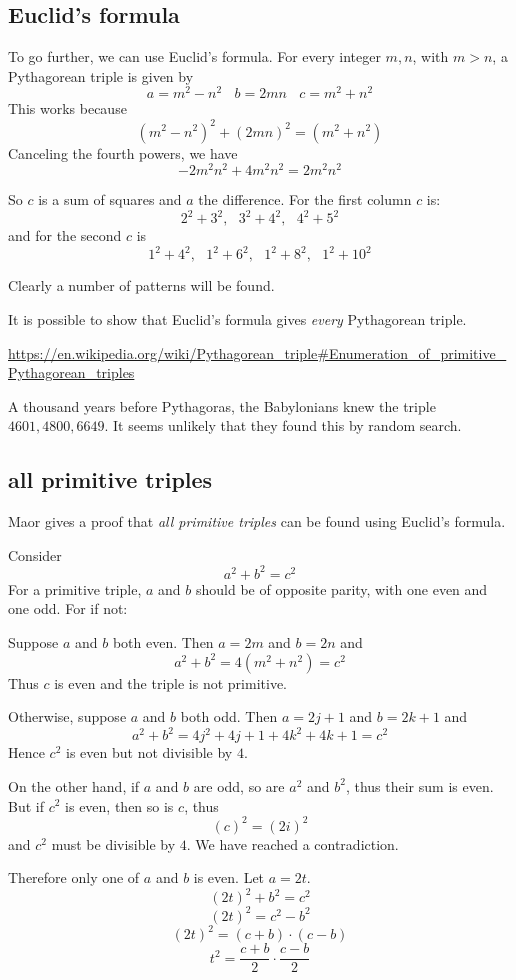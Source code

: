 \documentclass[11pt, oneside]{article}
\begin{document}
\subsection*{Euclid's formula}

To go further, we can use Euclid's formula.  For every integer $m,n$, with $m > n$, a Pythagorean triple is given by
\[ a = m^2 - n^2 \ \ \ \ b = 2mn \ \ \ \ c = m^2 + n^2 \]
This works because
\[ (m^2 - n^2)^2 + (2mn)^2  =  (m^2 + n^2) \]
Canceling the fourth powers, we have
\[ -2m^2n^2 + 4m^2n^2 = 2m^2n^2 \]

So $c$ is a sum of squares and $a$ the difference.  For the first column $c$ is:
\[ 2^2 + 3^2, \ \ \ 3^2 + 4^2, \ \ \ 4^2 + 5^2 \]
and for the second $c$ is
\[ 1^2 + 4^2, \ \ \ 1^2 + 6^2, \ \ \ 1^2 + 8^2, \ \ \ 1^2 + 10^2 \]

Clearly a number of patterns will be found.

It is possible to show that Euclid's formula gives \emph{every} Pythagorean triple.

\url{https://en.wikipedia.org/wiki/Pythagorean_triple#Enumeration_of_primitive_Pythagorean_triples}

A thousand years before Pythagoras, the Babylonians knew the triple $4601,4800,6649$.  It seems unlikely that they found this by random search.

\subsection*{all primitive triples}
Maor gives a proof that \emph{all primitive triples} can be found using Euclid's formula.

Consider 
\[ a^2 + b^2 = c^2 \]
For a primitive triple, $a$ and $b$ should be of opposite parity, with one even and one odd.  For if not:

Suppose $a$ and $b$ both even.  Then $a = 2m$ and $b = 2n$ and
\[ a^2 + b^2 = 4(m^2 + n^2) = c^2 \]
Thus $c$ is even and the triple is not primitive.

Otherwise, suppose $a$ and $b$ both odd.  Then $a = 2j +1$ and $b = 2k + 1$ and
\[ a^2 + b^2 = 4j^2 + 4j + 1 + 4k^2 + 4k + 1 = c^2 \]
Hence $c^2$ is even but not divisible by $4$.

On the other hand, if $a$ and $b$ are odd, so are $a^2$ and $b^2$, thus their sum is even.  But if $c^2$ is even, then so is $c$, thus 
\[ (c)^2 = (2i)^2 \]
and $c^2$ must be divisible by $4$.  We have reached a contradiction.  

Therefore only one of $a$ and $b$ is even.  Let $a = 2t$.
\[ (2t)^2 + b^2 = c^2 \]
\[ (2t)^2 = c^2 - b^2 \]
\[ (2t)^2 = (c + b) \cdot (c - b) \]
\[ t^2 = \frac{c+b}{2} \cdot \frac{c - b}{2} \]
\end{document}
